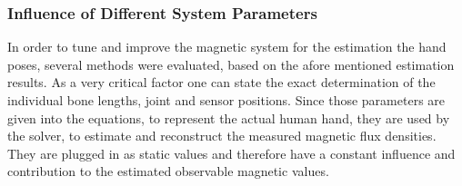 	
\subsubsection{Influence of Different System Parameters}

In order to tune and improve the magnetic system for the estimation the hand poses, several methods were evaluated, based on the afore mentioned estimation results. As a very critical factor one can state the exact determination of the individual bone lengths, joint and sensor positions. Since those parameters are given into the equations, to represent the actual human hand, they are used by the solver, to estimate and reconstruct the measured magnetic flux densities. 
They are plugged in as static values and therefore have a constant influence and contribution to the estimated observable magnetic values. 

